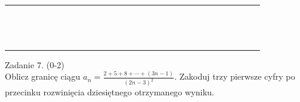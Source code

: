 \documentclass[10pt]{article}
\begin{document}
\begin{center}
\begin{tabular}{|c|c|c|c|c|c|c|c|c|c|c|c|c|c|c|c|c|c|c|c|c|c|c|c|c|c|c|c|c|c|}
\hline
 &  &  &  &  &  &  &  &  &  &  &  &  &  &  &  &  &  &  &  &  &  &  &  &  &  &  &  &  &  \\
\hline
 &  &  &  &  &  &  &  &  &  &  &  &  &  &  &  &  &  &  &  &  &  &  &  &  &  &  &  &  &  \\
\hline
 &  &  &  &  &  &  &  &  &  &  &  &  &  &  &  &  &  &  &  &  &  &  &  &  &  &  &  &  &  \\
\hline
 &  &  &  &  &  &  &  &  &  &  &  &  &  &  &  &  &  &  &  &  &  &  &  &  &  &  &  &  &  \\
\hline
 &  &  &  &  &  &  &  &  &  &  &  &  &  &  &  &  &  &  &  &  &  &  &  &  &  &  &  &  &  \\
\hline
 &  &  &  &  &  &  &  &  &  &  &  &  &  &  &  &  &  &  &  &  &  &  &  &  &  &  &  &  &  \\
\hline
 &  &  &  &  &  &  &  &  &  &  &  &  &  &  &  &  &  &  &  &  &  &  &  &  &  &  &  &  &  \\
\hline
 &  &  &  &  &  &  &  &  &  &  &  &  &  &  &  &  &  &  &  &  &  &  &  &  &  &  &  &  &  \\
\hline
 &  &  &  &  &  &  &  &  &  &  &  &  &  &  &  &  &  &  &  &  &  &  &  &  &  &  &  &  &  \\
\hline
 &  &  &  &  &  &  &  &  &  &  &  &  &  &  &  &  &  &  &  &  &  &  &  &  &  &  &  &  &  \\
\hline
 &  &  &  &  &  &  &  &  &  &  &  &  &  &  &  &  &  &  &  &  &  &  &  &  &  &  &  &  &  \\
\hline
 &  &  &  &  &  &  &  &  &  &  &  &  &  &  &  &  &  &  &  &  &  &  &  &  &  &  &  &  &  \\
\hline
 &  &  &  &  &  &  &  &  &  &  &  &  &  &  &  &  &  &  &  &  &  &  &  &  &  &  &  &  &  \\
\hline
 &  &  &  &  &  &  &  &  &  &  &  &  &  &  &  &  &  &  &  &  &  &  &  &  &  &  &  &  &  \\
\hline
 &  &  &  &  &  &  &  &  &  &  &  &  &  &  &  &  &  &  &  &  &  &  &  &  &  &  &  &  &  \\
\hline
\end{tabular}
\end{center}

Zadanie 7. (0-2)\\
Oblicz granicę ciągu \(a_{n}=\frac{2+5+8+\cdots+(3 n-1)}{(2 n-3)^{2}}\). Zakoduj trzy pierwsze cyfry po przecinku rozwinięcia dziesiętnego otrzymanego wyniku.
\end{document}
